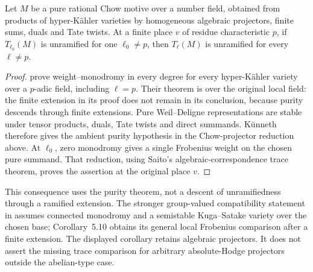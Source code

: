 \begin{corollary}
\label{c:hyperkahler-chow-unramified}
Let $M$ be a pure rational Chow motive over a number field, obtained
from products of hyper-K\"ahler varieties by homogeneous algebraic
projectors, finite sums, duals and Tate twists.  At a finite place
$v$ of residue characteristic $p$, if $T_{\ell_0}(M)$ is unramified
for one $\ell_0\ne p$, then $T_\ell(M)$ is unramified for every
$\ell\ne p$.
\end{corollary}

\begin{proof}
\citet[Theorem~4.4, with Lemmas~4.2--4.3]{c_itozou2026}
prove weight--monodromy in every degree for every hyper-K\"ahler
variety over a $p$-adic field, including $\ell=p$.  Their theorem
is over the original local field: the finite extension in its proof
does not remain in its conclusion, because purity descends through
finite extensions.  Pure Weil--Deligne representations are stable
under tensor products, duals, Tate twists and direct summands.
K\"unneth therefore gives the ambient purity hypothesis in the
Chow-projector reduction above.  At $\ell_0$, zero monodromy gives
a single Frobenius weight on the chosen pure summand.  That reduction,
using Saito's algebraic-correspondence trace theorem, proves the
assertion at the original place $v$.
\end{proof}

This consequence uses the purity theorem, not a descent of
unramifiedness through a ramified extension.  The stronger
group-valued compatibility statement in
\citet[Theorem~5.8 and Remark~5.9]{c_itozou2026} assumes connected
monodromy and a semistable Kuga--Satake variety over the chosen base;
Corollary~5.10 obtains its general local Frobenius comparison after
a finite extension.  The displayed corollary retains algebraic
projectors.  It does not assert the missing trace comparison for
arbitrary absolute-Hodge projectors outside the abelian-type case.
